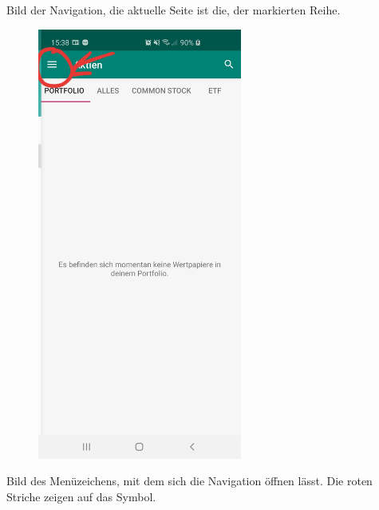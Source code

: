 \documentclass[10pt]{scrartcl}
\begin{document}
Bild der Navigation, die aktuelle Seite ist die, der markierten Reihe.

\begin{figure}[H]
	\centering
	\includegraphics[width=0.6\textwidth]{Bilder/Applikation/NavigationsSymbol.jpg}
\end{figure}

Bild des Menüzeichens, mit dem sich die Navigation öffnen lässt. Die roten Striche zeigen auf das Symbol.
\end{document}
